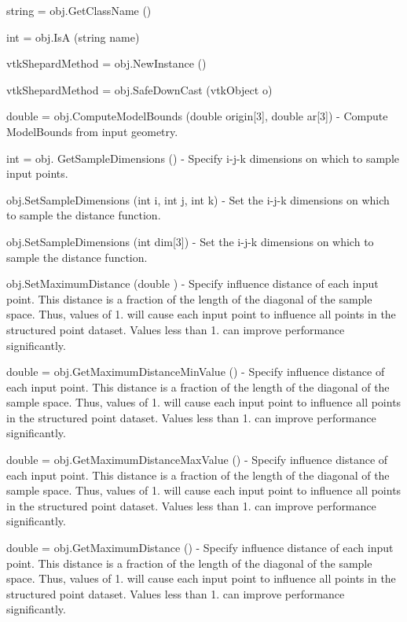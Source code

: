 \begin{DoxyItemize}
\item {\ttfamily string = obj.\-Get\-Class\-Name ()}  
\item {\ttfamily int = obj.\-Is\-A (string name)}  
\item {\ttfamily vtk\-Shepard\-Method = obj.\-New\-Instance ()}  
\item {\ttfamily vtk\-Shepard\-Method = obj.\-Safe\-Down\-Cast (vtk\-Object o)}  
\item {\ttfamily double = obj.\-Compute\-Model\-Bounds (double origin\mbox{[}3\mbox{]}, double ar\mbox{[}3\mbox{]})} -\/ Compute Model\-Bounds from input geometry.  
\item {\ttfamily int = obj. Get\-Sample\-Dimensions ()} -\/ Specify i-\/j-\/k dimensions on which to sample input points.  
\item {\ttfamily obj.\-Set\-Sample\-Dimensions (int i, int j, int k)} -\/ Set the i-\/j-\/k dimensions on which to sample the distance function.  
\item {\ttfamily obj.\-Set\-Sample\-Dimensions (int dim\mbox{[}3\mbox{]})} -\/ Set the i-\/j-\/k dimensions on which to sample the distance function.  
\item {\ttfamily obj.\-Set\-Maximum\-Distance (double )} -\/ Specify influence distance of each input point. This distance is a fraction of the length of the diagonal of the sample space. Thus, values of 1. will cause each input point to influence all points in the structured point dataset. Values less than 1. can improve performance significantly.  
\item {\ttfamily double = obj.\-Get\-Maximum\-Distance\-Min\-Value ()} -\/ Specify influence distance of each input point. This distance is a fraction of the length of the diagonal of the sample space. Thus, values of 1. will cause each input point to influence all points in the structured point dataset. Values less than 1. can improve performance significantly.  
\item {\ttfamily double = obj.\-Get\-Maximum\-Distance\-Max\-Value ()} -\/ Specify influence distance of each input point. This distance is a fraction of the length of the diagonal of the sample space. Thus, values of 1. will cause each input point to influence all points in the structured point dataset. Values less than 1. can improve performance significantly.  
\item {\ttfamily double = obj.\-Get\-Maximum\-Distance ()} -\/ Specify influence distance of each input point. This distance is a fraction of the length of the diagonal of the sample space. Thus, values of 1. will cause each input point to influence all points in the structured point dataset. Values less than 1. can improve performance significantly.  

\end{DoxyItemize}
